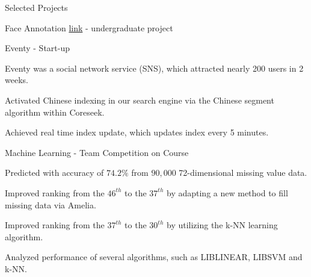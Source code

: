 \documentclass{cv}
\begin{document}
\begin{cvSection}{Selected Projects}
\begin{projectSubsection}{Face Annotation \href{http://cmlab.csie.ntu.edu.tw/~pi/face_annotation}{link}}{ - }{undergraduate project}
\end{projectSubsection}

\begin{projectSubsection}{Eventy}{ - }{Start-up}

\item Eventy was a social network service (SNS), which attracted nearly 200 users in 2 weeks.
\item Activated Chinese indexing in our search engine via the Chinese segment algorithm within Coreseek.
\item Achieved real time index update, which updates index every 5 minutes.

\end{projectSubsection}


\begin{projectSubsection}{Machine Learning}{ - }{Team Competition on Course}

\item Predicted with accuracy of $74.2\%$ from $90,000$ 72-dimensional missing value data.
\item Improved ranking from the $46^{th}$ to the $37^{th}$ by adapting a new method to fill missing data via Amelia.
\item Improved ranking from the $37^{th}$ to the $30^{th}$ by utilizing the k-NN learning algorithm.
\item Analyzed performance of several algorithms, such as LIBLINEAR, LIBSVM and k-NN.

\end{projectSubsection}

\end{cvSection}




\end{document}
